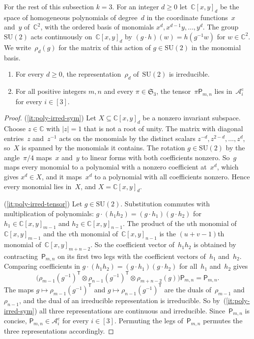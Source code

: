\documentclass[11pt,letterpaper]{article}
\newcommand{\polymult}{\mathsf{P}}
\newcommand{\CC}{\mathbb{C}}
\begin{document}
For the rest of this subsection $k = 3$. For an integer $d \geq 0$ let~$\CC[x,y]_d$ be the space of homogeneous polynomials of degree~$d$ in the coordinate functions~$x$ and~$y$ of~$\CC^2$, with the ordered basis of monomials $x^d, x^{d-1}y, \ldots, y^d$. The group $\mathrm{SU}(2)$ acts continuously on~$\CC[x,y]_d$ by $(g \cdot h)(w) = h(g^{-1} w)$ for $w \in \CC^2$. We write~$\rho_d(g)$ for the matrix of this action of $g \in \mathrm{SU}(2)$ in the monomial basis.

\begin{lemma}\label{lem:poly-irred}\hfill
\begin{enumerate}[\upshape(i)]
\item\label{it:poly-irred-sym} For every $d \geq 0$, the representation~$\rho_d$ of~$\mathrm{SU}(2)$ is irreducible.
\item\label{it:poly-irred-tensor} For all positive integers $m, n$ and every $\pi \in \mathfrak{S}_3$, the tensor~$\pi\polymult_{m,n}$ lies in~$\mathcal{A}^{\mathrm{c}}_i$ for every $i \in [3]$.
\end{enumerate}
\end{lemma}
\begin{proof}
(\ref{it:poly-irred-sym}) Let $X \subseteq \CC[x,y]_d$ be a nonzero invariant subspace. Choose $z \in \CC$ with $|z| = 1$ that is not a root of unity. The matrix with diagonal entries~$z$ and~$z^{-1}$ acts on the monomials by the distinct scalars $z^{-d}, z^{2-d}, \ldots, z^d$, so~$X$ is spanned by the monomials it contains. The rotation $g \in \mathrm{SU}(2)$ by the angle~$\pi/4$ maps~$x$ and~$y$ to linear forms with both coefficients nonzero. So~$g$ maps every monomial to a polynomial with a nonzero coefficient at~$x^d$, which gives $x^d \in X$, and it maps~$x^d$ to a polynomial with all coefficients nonzero. Hence every monomial lies in~$X$, and $X = \CC[x,y]_d$.

(\ref{it:poly-irred-tensor}) Let $g \in \mathrm{SU}(2)$. Substitution commutes with multiplication of polynomials: $g \cdot (h_1 h_2) = (g \cdot h_1)(g \cdot h_2)$ for $h_1 \in \CC[x,y]_{m-1}$ and $h_2 \in \CC[x,y]_{n-1}$. The product of the $u$th monomial of~$\CC[x,y]_{m-1}$ and the $v$th monomial of~$\CC[x,y]_{n-1}$ is the $(u+v-1)$th monomial of~$\CC[x,y]_{m+n-2}$. So the coefficient vector of~$h_1 h_2$ is obtained by contracting~$\polymult_{m,n}$ on its first two legs with the coefficient vectors of~$h_1$ and~$h_2$. Comparing coefficients in $g \cdot (h_1 h_2) = (g \cdot h_1)(g \cdot h_2)$ for all~$h_1$ and~$h_2$ gives
\[
\bigl(\rho_{m-1}(g^{-1})^{\mathsf{T}} \otimes \rho_{n-1}(g^{-1})^{\mathsf{T}} \otimes \rho_{m+n-2}(g)\bigr) \polymult_{m,n} = \polymult_{m,n}.
\]
The maps $g \mapsto \rho_{m-1}(g^{-1})^{\mathsf{T}}$ and $g \mapsto \rho_{n-1}(g^{-1})^{\mathsf{T}}$ are the duals of~$\rho_{m-1}$ and~$\rho_{n-1}$, and the dual of an irreducible representation is irreducible. So by~(\ref{it:poly-irred-sym}) all three representations are continuous and irreducible. Since~$\polymult_{m,n}$ is concise, $\polymult_{m,n} \in \mathcal{A}^{\mathrm{c}}_i$ for every $i \in [3]$. Permuting the legs of~$\polymult_{m,n}$ permutes the three representations accordingly.
\end{proof}
\end{document}
